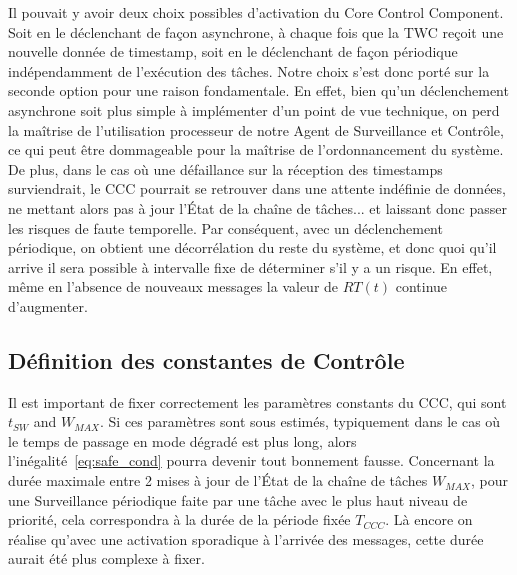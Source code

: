 \documentclass[french, a4paper, 11pt, twoside, pdftex]{StyleThese}
\begin{document}
        Il pouvait y avoir deux choix possibles d'activation du Core Control Component. Soit en le déclenchant de façon asynchrone, à chaque fois que la TWC reçoit une nouvelle donnée de timestamp, soit en le déclenchant de façon périodique indépendamment de l'exécution des tâches. Notre choix s'est donc porté sur la seconde option pour une raison fondamentale. En effet, bien qu'un déclenchement asynchrone soit plus simple à implémenter d'un point de vue technique, on perd la maîtrise de l'utilisation processeur de notre Agent de Surveillance et Contrôle, ce qui peut être dommageable pour la maîtrise de l'ordonnancement du système. De plus, dans le cas où une défaillance sur la réception des timestamps surviendrait, le CCC pourrait se retrouver dans une attente indéfinie de données, ne mettant alors pas à jour l'État de la chaîne de tâches... et laissant donc passer les risques de faute temporelle. Par conséquent, avec un déclenchement périodique, on obtient une décorrélation du reste du système, et donc quoi qu'il arrive il sera possible à intervalle fixe de déterminer s'il y a un risque. En effet, même en l'absence de nouveaux messages la valeur de $RT(t)$ continue d'augmenter. 
        
        
		\subsection{Définition des constantes de Contrôle}
        Il est important de fixer correctement les paramètres constants du CCC, qui sont $t_{SW}$ and $W_{MAX}$.
        Si ces paramètres sont sous estimés, typiquement dans le cas où le temps de passage en mode dégradé est plus long, alors l'inégalité~\ref{eq:safe_cond} pourra devenir tout bonnement fausse. 
        Concernant la durée maximale entre 2 mises à jour de l'État de la chaîne de tâches $W_{MAX}$, pour une Surveillance périodique faite par une tâche avec le plus haut niveau de priorité, cela correspondra à la durée de la période fixée $T_{CCC}$. Là encore on réalise qu'avec une activation sporadique à l'arrivée des messages, cette durée aurait été plus complexe à fixer. 
        
\end{document}
